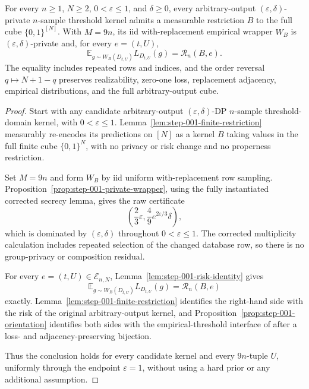 \begin{proposition}
\label{prop:step-001-result}
For every $n\geq1$, $N\geq2$, $0<\varepsilon\leq1$, and
$\delta\geq0$, every arbitrary-output
$(\varepsilon,\delta)$-private $n$-sample threshold kernel admits a
measurable restriction $B$ to the full cube $\{0,1\}^{[N]}$.  With
$M=9n$, its iid with-replacement empirical wrapper $W_B$ is
$(\varepsilon,\delta)$-private and, for every $e=(t,U)$,
\[
\mathbb E_{g\sim W_B(D_{t,U})}L_{D_{t,U}}(g)
=\mathcal R_n(B,e).
\]
The equality includes repeated rows and indices, and the order reversal
$q\mapsto N+1-q$ preserves realizability, zero-one loss, replacement
adjacency, empirical distributions, and the full arbitrary-output cube.
\end{proposition}
\begin{proof}

Start with any candidate arbitrary-output \((\varepsilon,\delta)\)-DP \(n\)-sample threshold-domain kernel, with \(0<\varepsilon\le 1\). Lemma~\ref{lem:step-001-finite-restriction} measurably re-encodes its predictions on \([N]\) as a kernel \(B\) taking values in the full finite cube \(\{0,1\}^N\), with no privacy or risk change and no properness restriction.

Set \(M=9n\) and form \(W_B\) by iid uniform with-replacement row sampling. Proposition~\ref{prop:step-001-private-wrapper}, using the fully instantiated corrected secrecy lemma, gives the raw certificate
\[
\left(\frac23\varepsilon,
\frac49e^{2\varepsilon/3}\delta\right),
\]
which is dominated by \((\varepsilon,\delta)\) throughout \(0<\varepsilon\le 1\). The corrected multiplicity calculation includes repeated selection of the changed database row, so there is no group-privacy or composition residual.

For every \(e=(t,U) \in \mathcal E_{n,N}\), Lemma~\ref{lem:step-001-risk-identity} gives
\[
\mathbb E_{g\sim W_B(D_{t,U})}L_{D_{t,U}}(g)
=\mathcal R_n(B,e)
\tag{19}\label{eq:step-001-19}
\]
exactly. Lemma~\ref{lem:step-001-finite-restriction} identifies the right-hand side with the risk of the original arbitrary-output kernel, and Proposition~\ref{prop:step-001-orientation} identifies both sides with the empirical-threshold interface of \citet{alonEtAl2018private} after a loss- and adjacency-preserving bijection.

Thus the conclusion holds for every candidate kernel and every \(9n\)-tuple \(U\), uniformly through the endpoint \(\varepsilon=1\), without using a hard prior or any additional assumption.

\end{proof}

